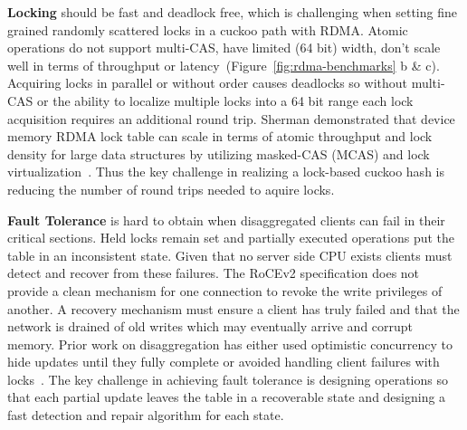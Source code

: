 \textbf{Locking} should be fast and deadlock free, which is
challenging when setting fine grained randomly scattered
locks in a cuckoo path with RDMA. Atomic operations do not
support multi-CAS, have limited (64 bit) width, don't scale
well in terms of throughput or
latency~\cite{design-guidelines}(Figure~\ref{fig:rdma-benchmarks}
b \& c). Acquiring locks in parallel or without order causes
deadlocks so without multi-CAS or the ability to localize
multiple locks into a 64 bit range each lock acquisition
requires an additional round trip.
Sherman demonstrated that device memory RDMA lock table can
scale in terms of atomic throughput and lock density for
large data structures by utilizing masked-CAS (MCAS) and
lock virtualization~\cite{sherman}. Thus the key challenge
in realizing a lock-based cuckoo hash is reducing the number
of round trips needed to aquire locks.


\textbf{Fault Tolerance} is hard to obtain when
disaggregated clients can fail in their critical sections.
Held locks remain set and partially executed operations put
the table in an inconsistent state. Given that no server
side CPU exists clients must detect and recover from these
failures. The RoCEv2 specification does not provide a clean
mechanism for one connection to revoke the write privileges
of another. A recovery mechanism must ensure a client has
truly failed and that the network is drained of old writes
which may eventually arrive and corrupt memory.
Prior work on disaggregation has either used optimistic
concurrency to hide updates until they fully complete or
avoided handling client failures with locks~\cite{sherman}.
The key challenge in achieving fault tolerance is designing
operations so that each partial update leaves the table in a
recoverable state and designing a fast detection and repair
algorithm for each state.

